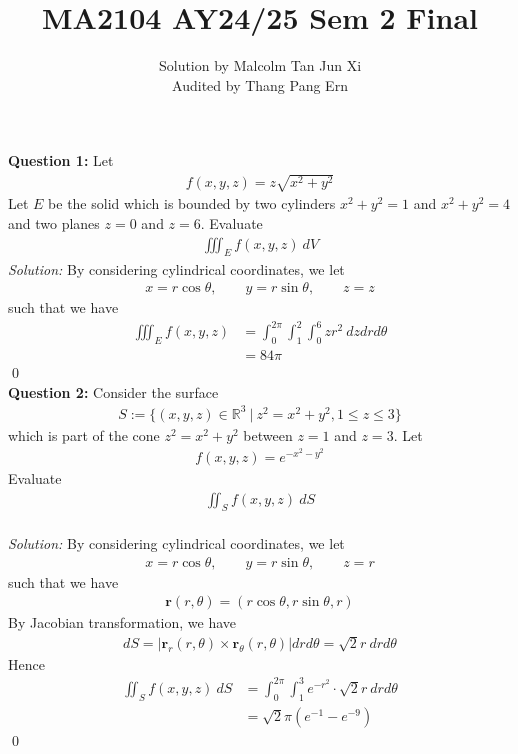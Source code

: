 \documentclass[12pt]{article}
\title{MA2104 AY24/25 Sem 2 Final}
\author{
  Solution by Malcolm Tan Jun Xi\\
  Audited by Thang Pang Ern
}
\date{}
\begin{document}
\maketitle
\noindent\textbf{Question 1:} Let
\begin{align*}
    f(x,y,z)=z\sqrt{x^2+y^2}
\end{align*}
Let $E$ be the solid which is bounded by two cylinders $x^2+y^2=1$ and $x^2+y^2=4$ and two planes $z=0$ and $z=6$. Evaluate
\begin{align*}
    \iiint_E f(x,y,z)\ dV
\end{align*}
\emph{Solution:} By considering cylindrical coordinates, we let
\begin{align*}
    x=r\cos\theta,\qquad y=r\sin\theta,\qquad z=z
\end{align*}
such that we have
\begin{align*}
    \iiint_E f(x,y,z)&=\int_0^{2\pi}\int_1^2\int_0^6 zr^2\ dzdrd\theta\\
    &=84\pi
\end{align*}\qed\\[2em]
\textbf{Question 2:} Consider the surface
\begin{align*}
    S:=\{(x,y,z)\in\mathbb{R}^3\ |\ z^2=x^2+y^2, 1\leq z\leq 3 \}
\end{align*}
which is part of the cone $z^2=x^2+y^2$ between $z=1$ and $z=3$. Let
\begin{align*}
    f(x,y,z)=e^{-x^2-y^2}
\end{align*}
Evaluate
\begin{align*}
    \iint_S f(x,y,z)\ dS
\end{align*}\\[2em]
\emph{Solution:}  By considering cylindrical coordinates, we let
\begin{align*}
    x=r\cos\theta,\qquad y=r\sin\theta,\qquad z=r
\end{align*}
such that we have
\begin{align*}
    \textbf{r}(r,\theta)=(r\cos\theta,r\sin\theta,r)
\end{align*}
By Jacobian transformation, we have
\begin{align*}
    dS=\left|\textbf{r}_r(r,\theta)\times \textbf{r}_\theta(r,\theta)\right|drd\theta=\sqrt{2}r\ drd\theta
\end{align*}
Hence
\begin{align*}
    \iint_Sf(x,y,z)\ dS&=\int_0^{2\pi}\int_1^3e^{-r^2}\cdot \sqrt{2}r\ drd\theta\\
    &=\sqrt{2}\pi(e^{-1}-e^{-9})
\end{align*}\qed\\[2em]
\end{document}
